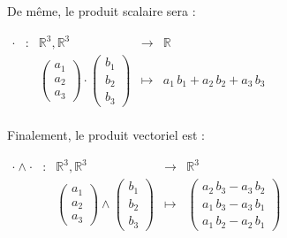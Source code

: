 De même, le produit scalaire sera :

$\begin{array}{ccccc}
\cdot & : & \mathbb{R}^3, \mathbb{R}^3 & \to & \mathbb{R} \\
& & \begin{pmatrix} a_1 \\ a_2 \\ a_3 \end{pmatrix} \cdot \begin{pmatrix} b_1 \\ b_2 \\ b_3 \end{pmatrix} & \mapsto & a_1 \, b_1 + a_2 \, b_2 + a_3 \, b_3 \end{array}$ \\ \\

Finalement, le produit vectoriel est :

$\begin{array}{ccccc}
\cdot \wedge \cdot & : & \mathbb{R}^3, \mathbb{R}^3 & \to & \mathbb{R}^3 \\
& & \begin{pmatrix} a_1 \\ a_2 \\ a_3 \end{pmatrix} \wedge \begin{pmatrix} b_1 \\ b_2 \\ b_3 \end{pmatrix} & \mapsto & \begin{pmatrix} a_2 \, b_3 - a_3 \, b_2 \\ a_1 \, b_3 - a_3 \, b_1 \\ a_1 \, b_2 - a_2 \, b_1 \end{pmatrix} \end{array}$

\pagebreak